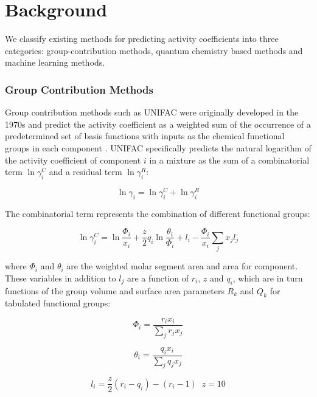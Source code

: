 \section{Background}

We classify existing methods for predicting activity coefficients into three categories: group-contribution methods, quantum chemistry based methods and machine learning methods. 

\subsubsection{Group Contribution Methods}

Group contribution methods such as UNIFAC were originally developed in the 1970s and predict the activity coefficient as a weighted sum of the occurrence of a predetermined set of basis functions with inputs as the chemical functional groups in each component \cite{Fredenslund1975}. UNIFAC specifically predicts the natural logarithm of the activity coefficient of component $i$ in  a mixture as the sum of a combinatorial term $\ln \gamma_i^C$ and a residual term $\ln \gamma_i^R$:

\begin{equation}
    \ln \gamma_i = \ln \gamma_i^C + \ln \gamma_i^R
\end{equation}

The combinatorial term represents the combination of different functional groups:

\begin{equation}
    \ln  \gamma^C_i = \ln \frac{\Phi_i}{x_i} + \frac{z}{2} q_i \ln \frac{\theta_i}{\Phi_i} + l_i - \frac{\Phi_i}{x_i} \sum_jx_jl_j
\end{equation}

where $\Phi_i$ and $\theta_i$ are the weighted molar segment area and area for component. These variables in addition to $l_j$ are a function of $r_i$, $z$ and $q_i$, which are  in turn functions of the group volume and surface area parameters $R_k$ and $Q_k$ for tabulated functional groups:

\begin{equation}
    \Phi_i  = \frac{r_i x_i}{\sum_j r_j x_j}
\end{equation}

\begin{equation}
    \theta_i = \frac{q_i x_i}{\sum_j q_j x_j}
\end{equation}

\begin{equation}
    l_i = \frac{z}{2}(r_i-q_i) - (r_i -1) \;\; z=10
\end{equation}

